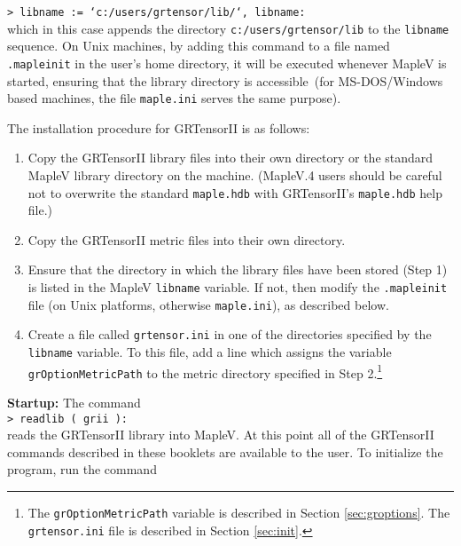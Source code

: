 \documentclass{article}
\begin{document}
\noindent\texttt{> libname := `c:/users/grtensor/lib/`, libname:}\\

\noindent which in this case appends the directory 
\texttt{c:/users/grtensor/lib} to the \texttt{libname} sequence. 
On Unix machines, by adding this command to a file named
\texttt{.mapleinit} in the user's home directory, it will be executed
whenever MapleV is started, ensuring that the library directory is
accessible\ (for MS-DOS/Windows based machines, the file
\texttt{maple.ini} serves the same
purpose).%
%
\begin{cmdspec}
The installation procedure for GRTensorII is as follows:
  \begin{enumerate}
    \item Copy the GRTensorII library files into their own directory or
      the standard MapleV library directory on the machine. (MapleV.4
      users should be careful not to overwrite the standard \texttt{maple.hdb}
      with GRTensorII's \texttt{maple.hdb} help file.)
    \item Copy the GRTensorII metric files into their own directory.
    \item Ensure that the directory in which the library files have been
      stored (Step 1) is listed in the MapleV \texttt{libname} variable.
      If not, then modify the \texttt{.mapleinit} file (on Unix platforms,
      otherwise \texttt{maple.ini}), as described below.
    \item Create a file called \texttt{grtensor.ini} in one of the
      directories specified by the \texttt{libname} variable. To this
      file, add a line which assigns the variable
      \texttt{grOptionMetricPath} to the metric directory specified in
      Step 2.\footnote{The \texttt{grOptionMetricPath} variable is
      described in Section \ref{sec:groptions}. The
      \texttt{grtensor.ini} file is described in Section
      \ref{sec:init}.}
  \end{enumerate}
\end{cmdspec}

\noindent\textbf{Startup:} The command\\

\noindent\texttt{> readlib ( grii ):}\\

\noindent reads the GRTensorII library into MapleV. At this point
all of the GRTensorII commands described in these booklets are
available to the user. To initialize the program, run the command\\
\end{document}
